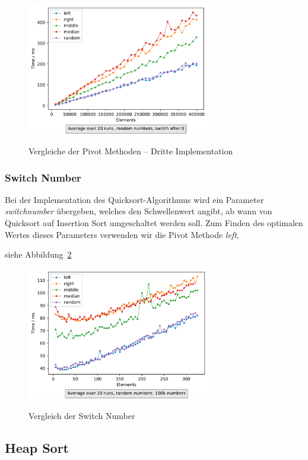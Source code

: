 \begin{figure}[hbt]
    \centering
    \caption{Vergleiche der Pivot Methoden -- Dritte Implementation}
    \includegraphics[width=8cm]
    {../out/pivotMethods.pdf}\label{fig:qsort-impl3-2}
\end{figure}

\FloatBarrier

\subsubsection{Switch Number}
Bei der Implementation des Quicksort-Algorithmus wird ein Parameter
\textit{switchnumber} übergeben, welches den Schwellenwert angibt, ab wann
von Quicksort auf Insertion Sort umgeschaltet werden soll.
Zum Finden des optimalen Wertes dieses Parameters verwenden wir die Pivot
Methode \textit{left},

siehe Abbildung~\ref{fig:qsort-switchPivot}

\begin{figure}[hbt]
    \centering
    \caption{Vergleich der Switch Number}
    \includegraphics[width=8cm]
    {../out/switchPivot.pdf}\label{fig:qsort-switchPivot}
\end{figure}

\subsection{Heap Sort}\label{subsec:heap-sort-laufzeit}

